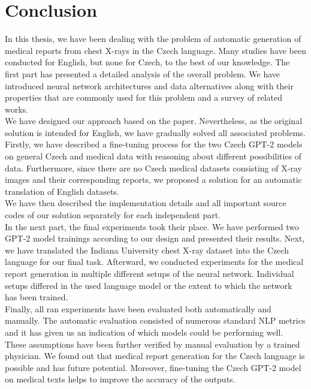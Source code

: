\chapter*{Conclusion}

In this thesis, we have been dealing with the problem of automatic generation of medical reports from chest X-rays in the Czech language. Many studies have been conducted for English, but none for Czech, to the best of our knowledge. The first part has presented a detailed analysis of the overall problem. We have introduced neural network architectures and data alternatives along with their properties that are commonly used for this problem and a survey of related works.\\

We have designed our approach based on the \citet{alfarghaly2021automated} paper. Nevertheless, as the original solution is intended for English, we have gradually solved all associated problems. Firstly, we have described a fine-tuning process for the two Czech GPT-2 models on general Czech and medical data with reasoning about different possibilities of data. Furthermore, since there are no Czech medical datasets consisting of X-ray images and their corresponding reports, we proposed a solution for an automatic translation of English datasets. \\

We have then described the implementation details and all important source codes of our solution separately for each independent part.\\

In the next part, the final experiments took their place. We have performed two GPT-2 model trainings according to our design and presented their results. Next, we have translated the Indiana University chest X-ray dataset into the Czech language for our final task. Afterward, we conducted experiments for the medical report generation in multiple different setups of the neural network. Individual setups differed in the used language model or the extent to which the network has been trained.\\

Finally, all ran experiments have been evaluated both automatically and manually. The automatic evaluation consisted of numerous standard NLP metrics and it has given us an indication of which models could be performing well. These assumptions have been further verified by manual evaluation by a trained physician. We found out that medical report generation for the Czech language is possible and has future potential. Moreover, fine-tuning the Czech GPT-2 model on medical texts helps to improve the accuracy of the outputs.
\newpage

